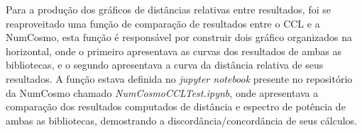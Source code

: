 Para a produção dos gráficos de distâncias relativas entre resultados, foi se reaproveitado uma função de comparação de resultados entre o CCL e a NumCosmo, esta função é responsável por construir dois gráfico organizados na horizontal, onde o primeiro apresentava as curvas dos resultados de ambas as bibliotecas, e o segundo apresentava a curva da distância relativa de seus resultados. A função estava definida no \textit{jupyter notebook} presente no repositório da NumCosmo chamado \textit{NumCosmoCCLTest.ipynb}, onde apresentava a comparação dos resultados computados de distância e espectro de potência de ambas as bibliotecas, demostrando a discordância/concordância de seus cálculos.











